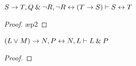 \begin{earg}
\filbreak

\item $S \rightarrow T, Q \mathbin{\&} {\neg} R, {\neg} R \leftrightarrow (T \rightarrow S) \vdash S \leftrightarrow T $\smallskip
\begin{proof}
 \pr{}
 \pr{}
 \pr{}
 \ae{p2}
 
 
\end{proof}
\medskip


\item $(L \vee M) \rightarrow N, P \leftrightarrow N, L \vdash L \mathbin{\&} P$\smallskip
\begin{proof}
 \pr{}
 \pr{}
 \pr{}
 
 
 
 
\end{proof}
\medskip

\end{earg}



